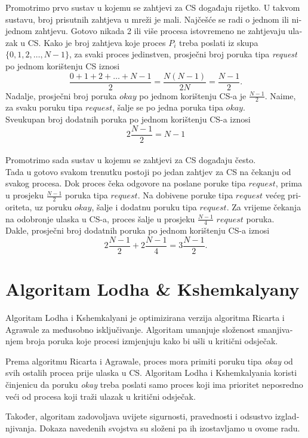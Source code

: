 \documentclass[12pt]{rectors}
\begin{document}
\begin{otherlanguage}{croatian}
Promotrimo prvo sustav u kojemu se zahtjevi za CS događaju rijetko.
U takvom sustavu, broj prisutnih zahtjeva u mreži je mali. Najčešće se radi o jednom ili nijednom zahtjevu. Gotovo nikada 2 ili više procesa istovremeno ne zahtjevaju ulazak u CS.
Kako je
broj zahtjeva koje proces $P_i$ treba poslati iz skupa $\{0,1,2,\hdots, N-1\}$, za svaki proces jedinstven, prosječni broj poruka tipa \textit{request} po jednom korištenju CS iznosi $$
	\frac{0+1+2+\hdots+N-1}{2} = \frac{N(N-1)}{2N} = \frac{N-1}{2}.
$$
Nadalje, prosječni broj poruka $okay$ po jednom korištenju CS-a je $\frac{N-1}{2}$. Naime, za svaku poruku tipa $request$, šalje se po jedna poruka tipa $okay$.\\
Sveukupan broj dodatnih poruka po jednom korištenju CS-a iznosi$$
	2\frac{N-1}{2} = N-1
$$
\vspace{0.5cm}
\\

Promotrimo sada sustav u kojemu se zahtjevi za CS događaju često.\\
Tada u gotovo svakom trenutku postoji po jedan zahtjev za CS na čekanju od svakog procesa.
Dok proces čeka odgovore na poslane poruke tipa $request$, prima u prosjeku $\frac{N-1}{2}$ poruka tipa $request$. Na dobivene poruke tipa $request$ većeg prioriteta, uz poruku $okay$, šalje i dodatnu poruku tipa $request$. Za vrijeme čekanja na odobronje ulaska u CS-a, proces šalje u prosjeku $\frac{N-1}{4}$ $request$ poruka. \\
Dakle, prosječni broj dodatnih poruka po jednom korištenju CS-a iznosi $$
	2\frac{N-1}{2} + 2\frac{N-1}{4} = 3\frac{N-1}{2}.
$$





\section{Algoritam Lodha \& Kshemkalyany}
Algoritam Lodha i Kshemkalyani je optimizirana verzija algoritma Ricarta i
Agrawale za međusobno isključivanje. Algoritam umanjuje složenost smanjivanjem broja poruka koje procesi izmjenjuju kako bi ušli u kritični odsječak.

Prema algoritmu Ricarta i Agrawale, proces mora primiti poruku tipa \textit{okay} od svih ostalih procea prije ulaska u CS. Algoritam Lodha i Kshemkalyania koristi činjenicu da poruku \textit{okay} treba poslati samo proces koji ima prioritet neposredno veći od procesa koji traži ulazak u kritični odsječak.

Također, algoritam zadovoljava uvijete sigurnosti, pravednosti i odsustvo izgladnjivanja.
Dokaza navedenih svojstva su složeni pa ih izostavljamo u ovome radu.


\end{otherlanguage}
\end{document}
